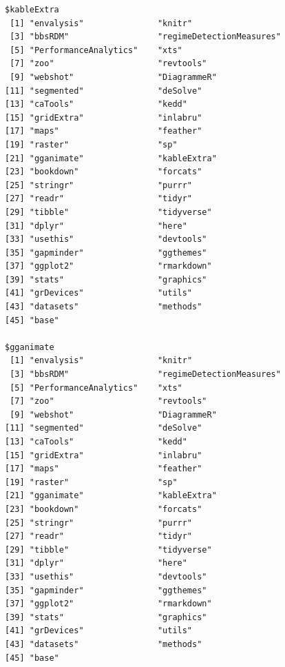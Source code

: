 \documentclass[12pt,twoside,openany]{reedthesis}
\begin{document}
\begin{verbatim}
$kableExtra
 [1] "envalysis"               "knitr"                  
 [3] "bbsRDM"                  "regimeDetectionMeasures"
 [5] "PerformanceAnalytics"    "xts"                    
 [7] "zoo"                     "revtools"               
 [9] "webshot"                 "DiagrammeR"             
[11] "segmented"               "deSolve"                
[13] "caTools"                 "kedd"                   
[15] "gridExtra"               "inlabru"                
[17] "maps"                    "feather"                
[19] "raster"                  "sp"                     
[21] "gganimate"               "kableExtra"             
[23] "bookdown"                "forcats"                
[25] "stringr"                 "purrr"                  
[27] "readr"                   "tidyr"                  
[29] "tibble"                  "tidyverse"              
[31] "dplyr"                   "here"                   
[33] "usethis"                 "devtools"               
[35] "gapminder"               "ggthemes"               
[37] "ggplot2"                 "rmarkdown"              
[39] "stats"                   "graphics"               
[41] "grDevices"               "utils"                  
[43] "datasets"                "methods"                
[45] "base"                   

$gganimate
 [1] "envalysis"               "knitr"                  
 [3] "bbsRDM"                  "regimeDetectionMeasures"
 [5] "PerformanceAnalytics"    "xts"                    
 [7] "zoo"                     "revtools"               
 [9] "webshot"                 "DiagrammeR"             
[11] "segmented"               "deSolve"                
[13] "caTools"                 "kedd"                   
[15] "gridExtra"               "inlabru"                
[17] "maps"                    "feather"                
[19] "raster"                  "sp"                     
[21] "gganimate"               "kableExtra"             
[23] "bookdown"                "forcats"                
[25] "stringr"                 "purrr"                  
[27] "readr"                   "tidyr"                  
[29] "tibble"                  "tidyverse"              
[31] "dplyr"                   "here"                   
[33] "usethis"                 "devtools"               
[35] "gapminder"               "ggthemes"               
[37] "ggplot2"                 "rmarkdown"              
[39] "stats"                   "graphics"               
[41] "grDevices"               "utils"                  
[43] "datasets"                "methods"                
[45] "base"                   


\end{verbatim}
\end{document}
